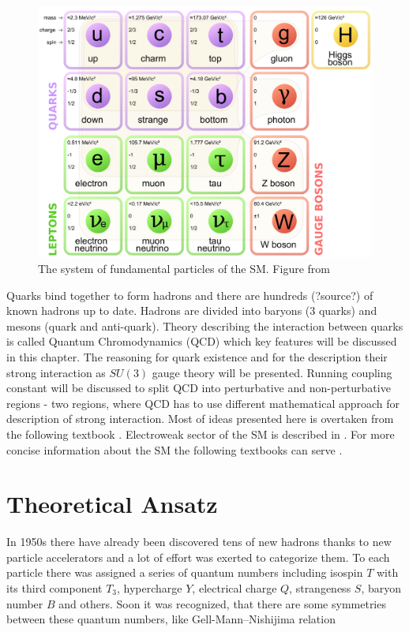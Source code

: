 \documentclass[a4paper,11pt]{report}
\begin{document}
\begin{figure}[!ht]
  \centering
  \includegraphics[width=\textwidth]{Chapter1/SM.png} 
  \caption{The system of fundamental particles of the SM. Figure from
    \cite{wiki:SMParticlesSource}}
  \label{fig:SMparticles}
\end{figure}

Quarks bind together to form hadrons and there are hundreds (?source?) of known
hadrons up to date. Hadrons are divided into baryons (3 quarks) and mesons
(quark and anti-quark). Theory describing the interaction between quarks is called
Quantum Chromodynamics (QCD) which key features will be discussed in this
chapter. The reasoning for quark existence and for the description their strong
interaction as $SU(3)$ gauge theory will be presented. Running coupling constant
will be discussed to split QCD into perturbative and non-perturbative regions -
two regions, where QCD has to use different mathematical approach for description of
strong interaction. Most of ideas presented here is overtaken from the following
textbook \cite{QCDTextbook}. Electroweak sector of the SM is described in
\cite{horejsi2002fundamentals}. For more concise information about the SM the
following textbooks can serve
\cite{griffiths2008introduction,cottingham2007introduction}.

\section{Theoretical Ansatz}
\label{Sec:TheoreticalAnsatz}

In 1950s there have already been discovered tens of new hadrons thanks to new
particle accelerators and a lot of effort was exerted to categorize them. To each
particle there was assigned a series of quantum numbers
including isospin $T$ with its third component $T_3$, hypercharge $Y$,
electrical charge $Q$, strangeness $S$, baryon number $B$ and others. Soon it
was recognized, that there are some symmetries between these quantum numbers,
like Gell-Mann--Nishijima relation \cite{GellMannNishijima1,GellMannNishijima2}
\end{document}
